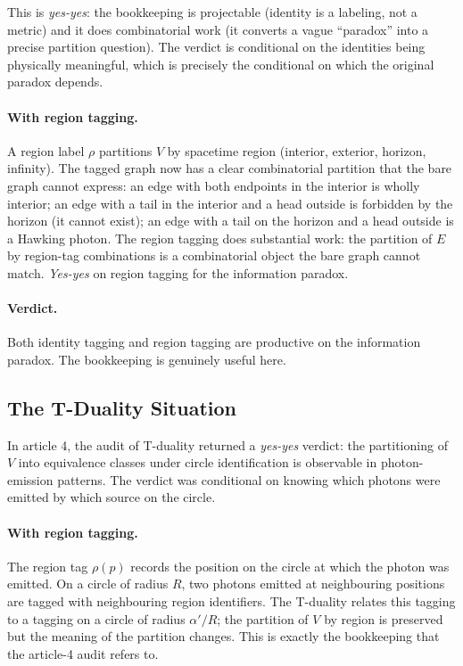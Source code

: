 \documentclass[11pt]{article}
\begin{document}
This is \emph{yes-yes}: the bookkeeping is projectable (identity is a labeling, not a metric) and it does combinatorial work (it converts a vague ``paradox'' into a precise partition question). The verdict is conditional on the identities being physically meaningful, which is precisely the conditional on which the original paradox depends.

\paragraph{With region tagging.} A region label $\rho$ partitions $V$ by spacetime region (interior, exterior, horizon, infinity). The tagged graph now has a clear combinatorial partition that the bare graph cannot express: an edge with both endpoints in the interior is wholly interior; an edge with a tail in the interior and a head outside is forbidden by the horizon (it cannot exist); an edge with a tail on the horizon and a head outside is a Hawking photon. The region tagging does substantial work: the partition of $E$ by region-tag combinations is a combinatorial object the bare graph cannot match. \emph{Yes-yes} on region tagging for the information paradox.

\paragraph{Verdict.} Both identity tagging and region tagging are productive on the information paradox. The bookkeeping is genuinely useful here.

\subsection{The T-Duality Situation}

In article 4, the audit of T-duality returned a \emph{yes-yes} verdict: the partitioning of $V$ into equivalence classes under circle identification is observable in photon-emission patterns. The verdict was conditional on knowing which photons were emitted by which source on the circle.

\paragraph{With region tagging.} The region tag $\rho(p)$ records the position on the circle at which the photon was emitted. On a circle of radius $R$, two photons emitted at neighbouring positions are tagged with neighbouring region identifiers. The T-duality relates this tagging to a tagging on a circle of radius $\alpha'/R$; the partition of $V$ by region is preserved but the meaning of the partition changes. This is exactly the bookkeeping that the article-4 audit refers to.
\end{document}
